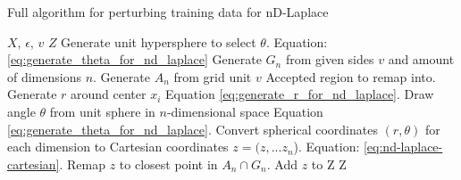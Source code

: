 \begin{algorithm}[H]
   \caption{Full algorithm for perturbing training data for nD-Laplace}
   \begin{algorithmic}
      \Require $X$,  $\epsilon$, $v$ 
      \Ensure $Z$ 
      \State Generate unit hypersphere to select $\theta$. \Comment Equation: \ref{eq:generate_theta_for_nd_laplace}
      \State Generate $G_n$ from given sides $v$ and amount of dimensions $n$.
        \State Generate $A_n$ from grid unit $v$ \Comment Accepted region to remap into. 
      \State Generate $r$ around center $x_i$ \Comment Equation \ref{eq:generate_r_for_nd_laplace}.
      \State Draw angle $\theta$ from unit sphere in $n$-dimensional space \Comment Equation \ref{eq:generate_theta_for_nd_laplace}.
      \State Convert spherical coordinates $(r, \theta)$ for \\ each dimension to Cartesian coordinates $z = (z, ...z_n$). \Comment Equation: \ref{eq:nd-laplace-cartesian}.
            \State Remap $z$ to closest point in $A_n \cap G_n$.
       \EndIf
      \State Add $z$ to Z
      \EndFor
      \State \Return Z
   \end{algorithmic}
   \label{alg:nd-laplace}
\end{algorithm}